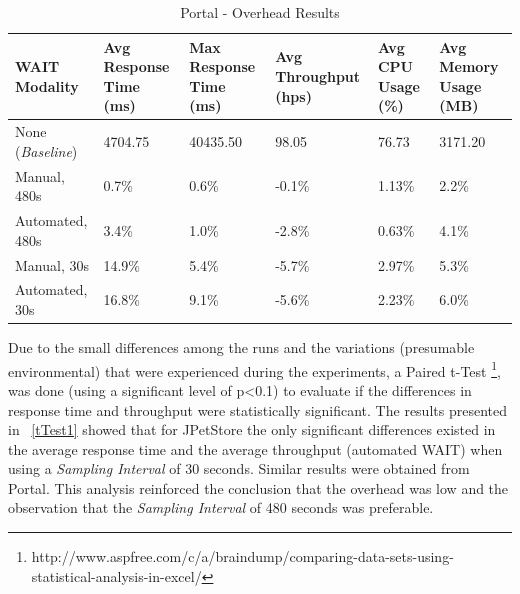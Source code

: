 \documentclass[runningheads,a4paper]{llncs}
\begin{document}
\begin{table}[!h]
\caption{Portal - Overhead Results}
\label{Portal1}
\centering
\begin{tabular}{p{}|p{}|p{}|p{}|p{}|p{}}
\hline
\bfseries WAIT Modality & \bfseries Avg Response Time (ms)& \bfseries Max
Response Time (ms)& \bfseries Avg Throughput (hps)& \bfseries Avg CPU Usage
(\%) & \bfseries Avg Memory Usage (MB)\\
\hline
None (\emph{Baseline}) 	& 4704.75	& 40435.50	& 98.05 	& 76.73 	& 3171.20\\
Manual, 480s 			& 0.7\% 	& 0.6\%		& -0.1\%	& 1.13\% 	& 2.2\%\\
Automated, 480s 		& 3.4\%		& 1.0\%		& -2.8\% 	& 0.63\% 	& 4.1\%\\
Manual, 30s 			& 14.9\%	& 5.4\%		& -5.7\% 	& 2.97\% 	& 5.3\%\\
Automated, 30s 			& 16.8\%	& 9.1\%		& -5.6\% 	& 2.23\% 	& 6.0\%\\
\hline
\end{tabular}
\end{table}

Due to the small differences among the runs and the variations (presumable
environmental) that were experienced during the experiments, a Paired t-Test
\footnote{http://www.aspfree.com/c/a/braindump/comparing-data-sets-using-statistical-analysis-in-excel/},
was done (using a significant level of p\textless0.1) to evaluate if the
differences in response time and throughput were statistically significant. 
The results presented in \tablename ~\ref{tTest1} showed that for JPetStore
the only significant differences existed in the average response time and the
average throughput (automated WAIT) when using a \emph{Sampling Interval} of 30
seconds. Similar results were obtained from Portal. This analysis reinforced the
conclusion that the overhead was low and the observation that the
\emph{Sampling Interval} of 480 seconds was preferable.
\end{document}
